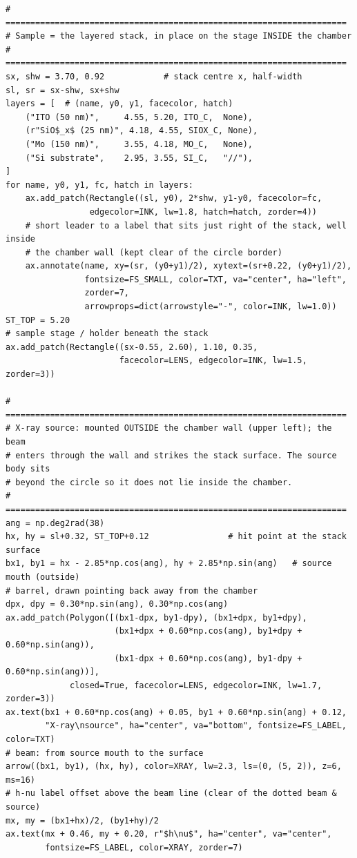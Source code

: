 \begin{lstlisting}[caption={schematics.ipynb code cell 1},label={lst:mrl-nb-schematics-1}]
# =====================================================================
# Sample = the layered stack, in place on the stage INSIDE the chamber
# =====================================================================
sx, shw = 3.70, 0.92            # stack centre x, half-width
sl, sr = sx-shw, sx+shw
layers = [  # (name, y0, y1, facecolor, hatch)
    ("ITO (50 nm)",     4.55, 5.20, ITO_C,  None),
    (r"SiO$_x$ (25 nm)", 4.18, 4.55, SIOX_C, None),
    ("Mo (150 nm)",     3.55, 4.18, MO_C,   None),
    ("Si substrate",    2.95, 3.55, SI_C,   "//"),
]
for name, y0, y1, fc, hatch in layers:
    ax.add_patch(Rectangle((sl, y0), 2*shw, y1-y0, facecolor=fc,
                 edgecolor=INK, lw=1.8, hatch=hatch, zorder=4))
    # short leader to a label that sits just right of the stack, well inside
    # the chamber wall (kept clear of the circle border)
    ax.annotate(name, xy=(sr, (y0+y1)/2), xytext=(sr+0.22, (y0+y1)/2),
                fontsize=FS_SMALL, color=TXT, va="center", ha="left",
                zorder=7,
                arrowprops=dict(arrowstyle="-", color=INK, lw=1.0))
ST_TOP = 5.20
# sample stage / holder beneath the stack
ax.add_patch(Rectangle((sx-0.55, 2.60), 1.10, 0.35,
                       facecolor=LENS, edgecolor=INK, lw=1.5, zorder=3))

# =====================================================================
# X-ray source: mounted OUTSIDE the chamber wall (upper left); the beam
# enters through the wall and strikes the stack surface. The source body sits
# beyond the circle so it does not lie inside the chamber.
# =====================================================================
ang = np.deg2rad(38)
hx, hy = sl+0.32, ST_TOP+0.12                # hit point at the stack surface
bx1, by1 = hx - 2.85*np.cos(ang), hy + 2.85*np.sin(ang)   # source mouth (outside)
# barrel, drawn pointing back away from the chamber
dpx, dpy = 0.30*np.sin(ang), 0.30*np.cos(ang)
ax.add_patch(Polygon([(bx1-dpx, by1-dpy), (bx1+dpx, by1+dpy),
                      (bx1+dpx + 0.60*np.cos(ang), by1+dpy + 0.60*np.sin(ang)),
                      (bx1-dpx + 0.60*np.cos(ang), by1-dpy + 0.60*np.sin(ang))],
             closed=True, facecolor=LENS, edgecolor=INK, lw=1.7, zorder=3))
ax.text(bx1 + 0.60*np.cos(ang) + 0.05, by1 + 0.60*np.sin(ang) + 0.12,
        "X-ray\nsource", ha="center", va="bottom", fontsize=FS_LABEL, color=TXT)
# beam: from source mouth to the surface
arrow((bx1, by1), (hx, hy), color=XRAY, lw=2.3, ls=(0, (5, 2)), z=6, ms=16)
# h-nu label offset above the beam line (clear of the dotted beam & source)
mx, my = (bx1+hx)/2, (by1+hy)/2
ax.text(mx + 0.46, my + 0.20, r"$h\nu$", ha="center", va="center",
        fontsize=FS_LABEL, color=XRAY, zorder=7)


\end{lstlisting}
